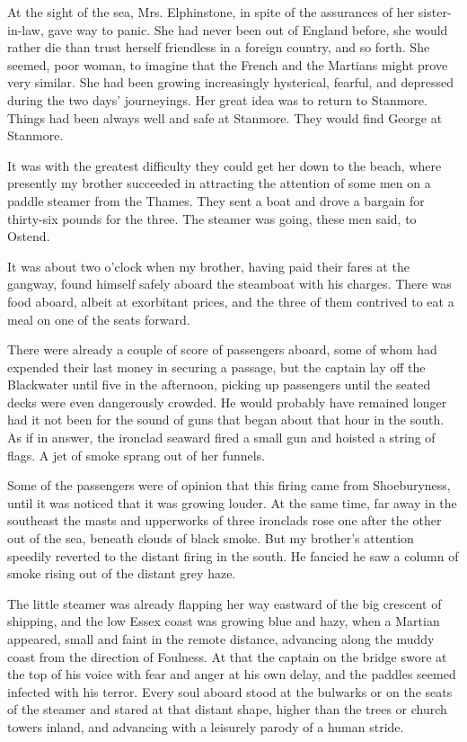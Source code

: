 At the sight of the sea, Mrs. Elphinstone, in spite of the
assurances of her sister-in-law, gave way to panic. She had never
been out of England before, she would rather die than trust herself
friendless in a foreign country, and so forth. She seemed, poor
woman, to imagine that the French and the Martians might prove very
similar. She had been growing increasingly hysterical, fearful, and
depressed during the two days' journeyings. Her great idea was to
return to Stanmore. Things had been always well and safe at
Stanmore. They would find George at Stanmore.

It was with the greatest difficulty they could get her down to the
beach, where presently my brother succeeded in attracting the
attention of some men on a paddle steamer from the Thames. They
sent a boat and drove a bargain for thirty-six pounds for the
three. The steamer was going, these men said, to Ostend.

It was about two o'clock when my brother, having paid their fares
at the gangway, found himself safely aboard the steamboat with his
charges. There was food aboard, albeit at exorbitant prices, and
the three of them contrived to eat a meal on one of the seats
forward.

There were already a couple of score of passengers aboard, some of
whom had expended their last money in securing a passage, but the
captain lay off the Blackwater until five in the afternoon, picking
up passengers until the seated decks were even dangerously crowded.
He would probably have remained longer had it not been for the
sound of guns that began about that hour in the south. As if in
answer, the ironclad seaward fired a small gun and hoisted a string
of flags. A jet of smoke sprang out of her funnels.

Some of the passengers were of opinion that this firing came from
Shoeburyness, until it was noticed that it was growing louder. At
the same time, far away in the southeast the masts and upperworks
of three ironclads rose one after the other out of the sea, beneath
clouds of black smoke. But my brother's attention speedily reverted
to the distant firing in the south. He fancied he saw a column of
smoke rising out of the distant grey haze.

The little steamer was already flapping her way eastward of the big
crescent of shipping, and the low Essex coast was growing blue and
hazy, when a Martian appeared, small and faint in the remote
distance, advancing along the muddy coast from the direction of
Foulness. At that the captain on the bridge swore at the top of his
voice with fear and anger at his own delay, and the paddles seemed
infected with his terror. Every soul aboard stood at the bulwarks
or on the seats of the steamer and stared at that distant shape,
higher than the trees or church towers inland, and advancing with a
leisurely parody of a human stride.

